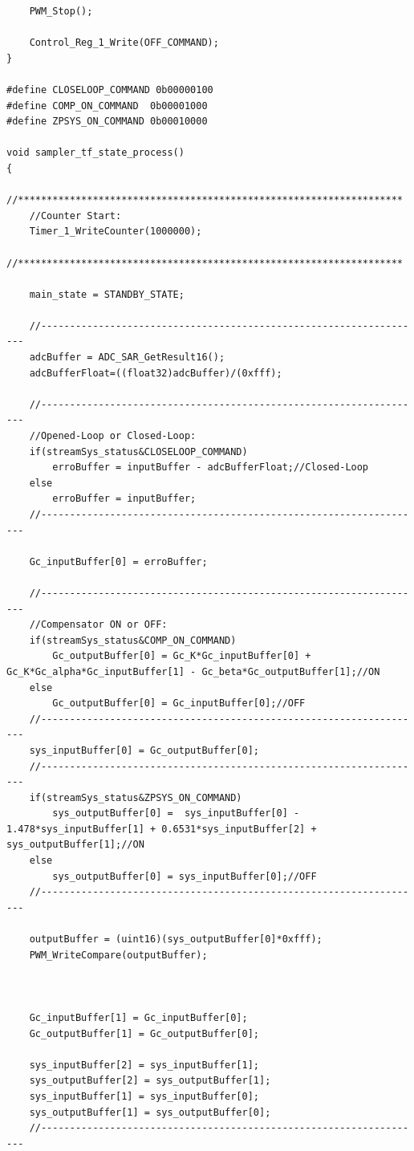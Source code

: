 \documentclass[
	article,			%
	11pt,				%
	oneside,			%
	a4paper,			%
	english,			%
	brazil,				%
	sumario=tradicional
	]{abntex2}
\begin{document}
\begin{apendicesenv}
\begin{lstlisting}
    PWM_Stop();
    
    Control_Reg_1_Write(OFF_COMMAND);   
}

#define CLOSELOOP_COMMAND 0b00000100
#define COMP_ON_COMMAND  0b00001000
#define ZPSYS_ON_COMMAND 0b00010000

void sampler_tf_state_process()
{
    //*******************************************************************
    //Counter Start:
    Timer_1_WriteCounter(1000000);
    //*******************************************************************
    
    main_state = STANDBY_STATE;
   
    //-------------------------------------------------------------------
    adcBuffer = ADC_SAR_GetResult16(); 
    adcBufferFloat=((float32)adcBuffer)/(0xfff);    
    
    //-------------------------------------------------------------------
    //Opened-Loop or Closed-Loop:
    if(streamSys_status&CLOSELOOP_COMMAND)
        erroBuffer = inputBuffer - adcBufferFloat;//Closed-Loop        
    else
        erroBuffer = inputBuffer;
    //-------------------------------------------------------------------

    Gc_inputBuffer[0] = erroBuffer; 
    
    //-------------------------------------------------------------------
    //Compensator ON or OFF:
    if(streamSys_status&COMP_ON_COMMAND)
        Gc_outputBuffer[0] = Gc_K*Gc_inputBuffer[0] + Gc_K*Gc_alpha*Gc_inputBuffer[1] - Gc_beta*Gc_outputBuffer[1];//ON         
    else
        Gc_outputBuffer[0] = Gc_inputBuffer[0];//OFF         
    //-------------------------------------------------------------------    
    sys_inputBuffer[0] = Gc_outputBuffer[0]; 
    //-------------------------------------------------------------------
    if(streamSys_status&ZPSYS_ON_COMMAND)
        sys_outputBuffer[0] =  sys_inputBuffer[0] - 1.478*sys_inputBuffer[1] + 0.6531*sys_inputBuffer[2] + sys_outputBuffer[1];//ON        
    else
        sys_outputBuffer[0] = sys_inputBuffer[0];//OFF                        
    //-------------------------------------------------------------------
  
    outputBuffer = (uint16)(sys_outputBuffer[0]*0xfff);   
    PWM_WriteCompare(outputBuffer);
    

    
    Gc_inputBuffer[1] = Gc_inputBuffer[0];
    Gc_outputBuffer[1] = Gc_outputBuffer[0];
    
    sys_inputBuffer[2] = sys_inputBuffer[1];
    sys_outputBuffer[2] = sys_outputBuffer[1];  
    sys_inputBuffer[1] = sys_inputBuffer[0];
    sys_outputBuffer[1] = sys_outputBuffer[0];     
    //-------------------------------------------------------------------
    


\end{lstlisting}
\end{apendicesenv}
\end{document}
